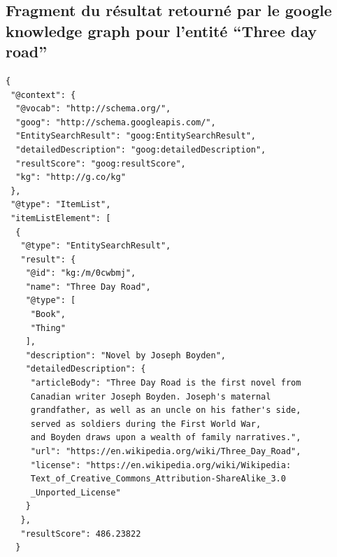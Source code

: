 \documentclass[12pt]{article}
\begin{document}
\begin{appendices}
\subsection{Fragment du résultat retourné par le google knowledge graph pour l'entité \enquote{Three day road}}

\begin{lstlisting}
{
 "@context": {
  "@vocab": "http://schema.org/",
  "goog": "http://schema.googleapis.com/",
  "EntitySearchResult": "goog:EntitySearchResult",
  "detailedDescription": "goog:detailedDescription",
  "resultScore": "goog:resultScore",
  "kg": "http://g.co/kg"
 },
 "@type": "ItemList",
 "itemListElement": [
  {
   "@type": "EntitySearchResult",
   "result": {
    "@id": "kg:/m/0cwbmj",
    "name": "Three Day Road",
    "@type": [
     "Book",
     "Thing"
    ],
    "description": "Novel by Joseph Boyden",
    "detailedDescription": {
     "articleBody": "Three Day Road is the first novel from 
     Canadian writer Joseph Boyden. Joseph's maternal 
     grandfather, as well as an uncle on his father's side, 
     served as soldiers during the First World War, 
     and Boyden draws upon a wealth of family narratives.",
     "url": "https://en.wikipedia.org/wiki/Three_Day_Road",
     "license": "https://en.wikipedia.org/wiki/Wikipedia:
     Text_of_Creative_Commons_Attribution-ShareAlike_3.0
     _Unported_License"
    }
   },
   "resultScore": 486.23822
  }
\end{lstlisting}

\end{appendices}
\end{document}
